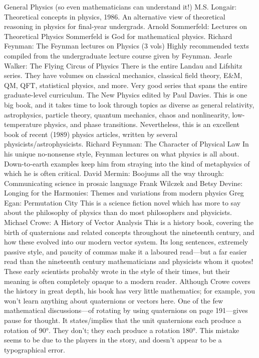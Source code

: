 \documentclass[10pt,a4paper]{book}
\theoremstyle{definition}
\begin{document}
General Physics (so even mathematicians can understand it!)
M.S. Longair: Theoretical concepts in physics, 1986.
An alternative view of theoretical reasoning in physics for final-year undergrads.
Arnold Sommerfeld: Lectures on Theoretical Physics
Sommerfeld is God for mathematical physics.
Richard Feynman: The Feynman lectures on Physics (3 vols)
Highly recommended texts compiled from the undergraduate lecture course given by Feynman.
Jearle Walker: The Flying Circus of Physics
There is the entire Landau and Lifshitz series.  They have volumes on classical mechanics, classical field theory, E\&M, QM, QFT, statistical physics, and more.  Very good series that spans the entire graduate-level curriculum.
The New Physics edited by Paul Davies.
This is one big book, and it takes time to look through topics as diverse as general relativity, astrophysics, particle theory, quantum mechanics, chaos and nonlinearity, low-temperature physics, and phase transitions.  Nevertheless, this is an excellent book of recent (1989) physics articles, written by several physicists/astrophysicists.
Richard Feynman: The Character of Physical Law
In his unique no-nonsense style, Feynman lectures on what physics is all about.  Down-to-earth examples keep him from straying into the kind of metaphysics of which he is often critical.
David Mermin: Boojums all the way through: Communicating science in prosaic language
Frank Wilczek and Betsy Devine: Longing for the Harmonies: Themes and variations from modern physics
Greg Egan: Permutation City
This is a science fiction novel which has more to say about the philosophy of physics than do most philosophers and physicists.
Michael Crowe: A History of Vector Analysis
This is a history book, covering the birth of quaternions and related concepts throughout the nineteenth century, and how these evolved into our modern vector system.  Its long sentences, extremely passive style, and paucity of commas make it a laboured read—but a far easier read than the nineteenth century mathematicians and physicists whom it quotes!  These early scientists probably wrote in the style of their times, but their meaning is often completely opaque to a modern reader.  Although Crowe covers the history in great depth, his book has very little mathematics; for example, you won't learn anything about quaternions or vectors here.  One of the few mathematical discussions—of rotating by using quaternions on page 191—gives pause for thought.  It states/implies that the unit quaternions each produce a rotation of 90°.  They don't; they each produce a rotation 180°.  This mistake seems to be due to the players in the story, and doesn't appear to be a typographical error.
\end{document}
